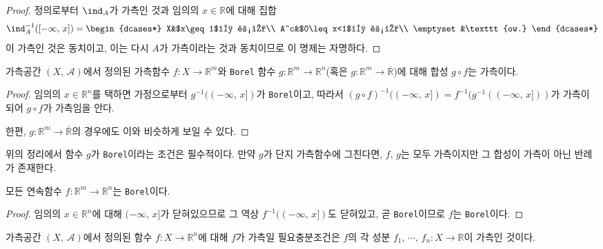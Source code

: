 \begin{proof}
    정의로부터 $\ind_A$가 가측인 것과 임의의 $x\in\mathbb{R}$에 대해 집합
    \begin{equation*}
        \ind_A^{-1}([-\infty,\,x])=
        \begin{dcases*}
            X&$x\geq1$인 경우\\
            A^c&$0\leq x<1$인 경우\\
            \emptyset&\texttt{ow.}
        \end{dcases*}
    \end{equation*}
    이 가측인 것은 동치이고, 이는 다시 $A$가 가측이라는 것과 동치이므로 이 명제는 자명하다.
\end{proof}

\begin{theorem}\label{thm:compositionMeasurable}
    가측공간 $(X,\,\mathcal{A})$에서 정의된 가측함수 $f:X\to\mathbb{R}^m$와 \texttt{Borel} 함수 $g:\mathbb{R}^m\to\mathbb{R}^n$(혹은 $g:\mathbb{R}^m\to\overline{\mathbb{R}}$)에 대해 합성 $g\circ f$는 가측이다.
\end{theorem}

\begin{proof}
    임의의 $x\in\mathbb{R}^n$를 택하면 가정으로부터 $g^{-1}((-\infty,\,x])$가 \texttt{Borel}이고, 따라서 $(g\circ f)^{-1}((-\infty,\,x])=f^{-1}(g^{-1}((-\infty,\,x]))$가 가측이 되어 $g\circ f$가 가측임을 안다.
    
    한편, $g:\mathbb{R}^m\to\overline{\mathbb{R}}$의 경우에도 이와 비슷하게 보일 수 있다.
\end{proof}

위의 정리에서 함수 $g$가 \texttt{Borel}이라는 조건은 필수적이다. 만약 $g$가 단지 가측함수에 그친다면, $f,\,g$는 모두 가측이지만 그 합성이 가측이 아닌 반례가 존재한다.\footnotemark

\begin{theorem}\label{thm:continuousMeasurable}
    모든 연속함수 $f:\mathbb{R}^m\to\mathbb{R}^n$는 \texttt{Borel}이다.
\end{theorem}

\begin{proof}
    임의의 $x\in\mathbb{R}^n$에 대해 $(-\infty,\,x]$가 닫혀있으므로 그 역상 $f^{-1}((-\infty,\,x])$도 닫혀있고, 곧 \texttt{Borel}이므로 $f$는 \texttt{Borel}이다.
\end{proof}

\begin{theorem}\label{thm:componentMeasurable}
    가측공간 $(X,\,\mathcal{A})$에서 정의된 함수 $f:X\to\mathbb{R}^n$에 대해 $f$가 가측일 필요충분조건은 $f$의 각 성분 $f_1,\,\cdots,\,f_n:X\to\mathbb{R}$이 가측인 것이다.
\end{theorem}

